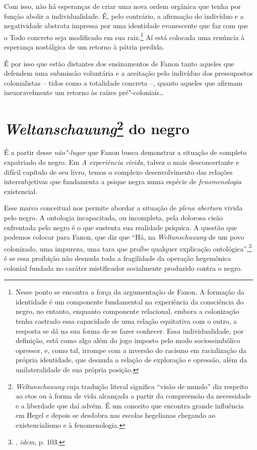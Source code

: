 Com isso, não há esperanças de criar uma nova ordem orgânica que tenha
por função abolir a individualidade. É, pelo contrário, a afirmação do
indivíduo e a negatividade abstrata impressa por uma identidade
evanescente que faz com que o Todo concreto seja modificado em sua
raiz.\footnote{Nesse ponto se encontra a força da argumentação de Fanon.
  A formação da identidade é um componente fundamental na experiência da
  consciência do negro, no entanto, enquanto componente relacional,
  embora a colonização tenha castrado essa capacidade de uma relação
  equitativa com o outro, a resposta se dá na sua forma de se fazer
  conhecer. Essa individualidade, por definição, está como algo além do
  jogo imposto pelo modo sociossimbólico opressor, e, como tal, irrompe
  com a inversão do racismo em racialização da própria identidade, que
  desnuda a relação de exploração e opressão, além da unilateralidade de
  sua própria posição.} Aí está colocada uma renúncia à esperança
nostálgica de um retorno à pátria perdida.

É por isso que estão distantes dos ensinamentos de Fanon tanto aqueles
que defendem uma submissão voluntária e a aceitação pelo indivíduo dos
pressupostos colonialistas -- tidos como a totalidade concreta --, quanto aqueles que afirmam
inexoravelmente um retorno às raízes pré"-coloniais\ldots{}

\chapter{\emph{Weltanschauung}\footnote{\emph{Weltanschauung} cuja tradução literal significa ``visão de mundo'' diz respeito ao etos ou à forma de vida alcançada a partir da compreensão da necessidade e a liberdade que daí advém. É um conceito que encontra grande influência em Hegel e depois se desdobra nas escolas hegelianas chegando ao existencialismo e à fenomenologia.} do negro}

É a partir desse \emph{não"-lugar} que Fanon busca demonstrar a situação
de completo expatriado do negro. Em \emph{A experiência vivida}, talvez
o mais desconcertante e difícil capítulo de seu livro, temos o complexo
desenvolvimento das relações intersubjetivas que fundamenta a psique
negra numa espécie de \emph{fenomenologia} existencial.

Esse marco conceitual nos permite abordar a situação de \emph{plena
abertura} vivida pelo negro. A ontologia incapacitada, ou incompleta,
pela dolorosa cisão enfrentada pelo negro é o que sustenta sua realidade
psíquica. A questão que podemos
colocar para Fanon, que diz que ``Há, na \emph{Weltanschauung} de um
povo colonizado, uma impureza, uma tara que proíbe qualquer explicação
ontológica'',\footnote{, \emph{idem}, p. 103.} é se essa proibição não
desnuda toda a fragilidade da operação hegemônica colonial fundada no
caráter mistificador socialmente produzido contra o negro.

